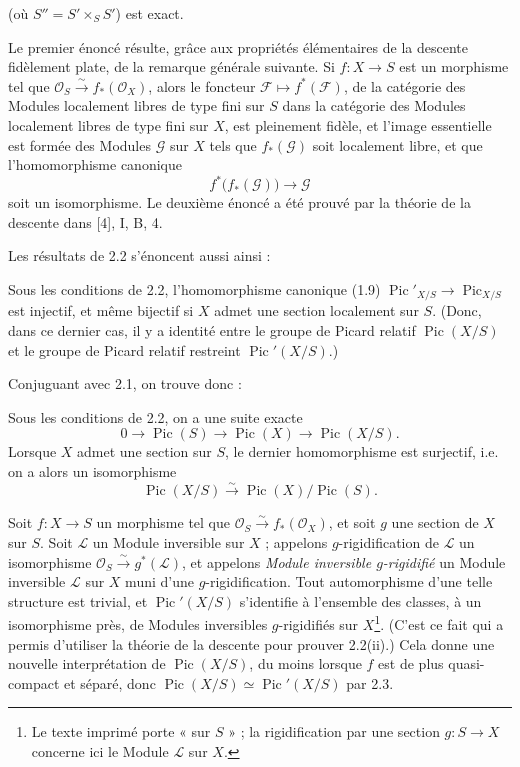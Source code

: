 (où $S''=S'\times_SS'$) est exact.

Le premier énoncé résulte, grâce aux propriétés élémentaires de la descente
fidèlement plate, de la remarque générale suivante. Si $f:X\longrightarrow S$
est un morphisme tel que $\mathcal O_S\xrightarrow{\sim}f_*(\mathcal O_X)$,
alors le foncteur $\mathcal F\longmapsto f^*(\mathcal F)$, de la catégorie des
Modules localement libres de type fini sur $S$ dans la catégorie des Modules
localement libres de type fini sur $X$, est pleinement fidèle, et l'image
essentielle est formée des Modules $\mathcal G$ sur $X$ tels que
$f_*(\mathcal G)$ soit localement libre, et que l'homomorphisme canonique
\[
f^*\bigl(f_*(\mathcal G)\bigr)\longrightarrow\mathcal G
\]
soit un isomorphisme. Le deuxième énoncé a été prouvé par la théorie de la
descente dans [4], I, B, 4.

Les résultats de 2.2 s'énoncent aussi ainsi :

 Sous les conditions de 2.2, l'homomorphisme canonique
(1.9) $\operatorname{Pic}'_{X/S}\longrightarrow\operatorname{Pic}_{X/S}$ est
injectif, et même bijectif si $X$ admet une section localement sur $S$. (Donc,
dans ce dernier cas, il y a identité entre le groupe de Picard relatif
$\operatorname{Pic}(X/S)$ et le groupe de Picard relatif restreint
$\operatorname{Pic}'(X/S)$.)

Conjuguant avec 2.1, on trouve donc :

 Sous les conditions de 2.2, on a une suite exacte
\[
0\longrightarrow\operatorname{Pic}(S)\longrightarrow\operatorname{Pic}(X)
\longrightarrow\operatorname{Pic}(X/S).
\]
Lorsque $X$ admet une section sur $S$, le dernier homomorphisme est surjectif,
i.e. on a alors un isomorphisme
\[
\operatorname{Pic}(X/S)\xrightarrow{\sim}
\operatorname{Pic}(X)/\operatorname{Pic}(S).
\]

 Soit $f:X\longrightarrow S$ un morphisme tel que
$\mathcal O_S\xrightarrow{\sim}f_*(\mathcal O_X)$, et soit $g$ une section de
$X$ sur $S$. Soit $\mathcal L$ un Module inversible sur $X$ ; appelons
$g$-rigidification de $\mathcal L$ un isomorphisme
$\mathcal O_S\xrightarrow{\sim}g^*(\mathcal L)$, et appelons \emph{Module
inversible $g$-rigidifié} un Module inversible $\mathcal L$ sur $X$ muni d'une
$g$-rigidification. Tout automorphisme d'une telle structure est trivial, et
$\operatorname{Pic}'(X/S)$ s'identifie à l'ensemble des classes, à un
isomorphisme près, de Modules inversibles $g$-rigidifiés sur $X$\footnote{Le
texte imprimé porte « sur $S$ » ; la rigidification par une section
$g:S\to X$ concerne ici le Module $\mathcal L$ sur $X$.}. (C'est ce fait qui a
permis d'utiliser la théorie de la descente pour prouver 2.2(ii).) Cela donne
une nouvelle interprétation de $\operatorname{Pic}(X/S)$, du moins lorsque $f$
est de plus quasi-compact et séparé, donc
$\operatorname{Pic}(X/S)\simeq\operatorname{Pic}'(X/S)$ par 2.3.

